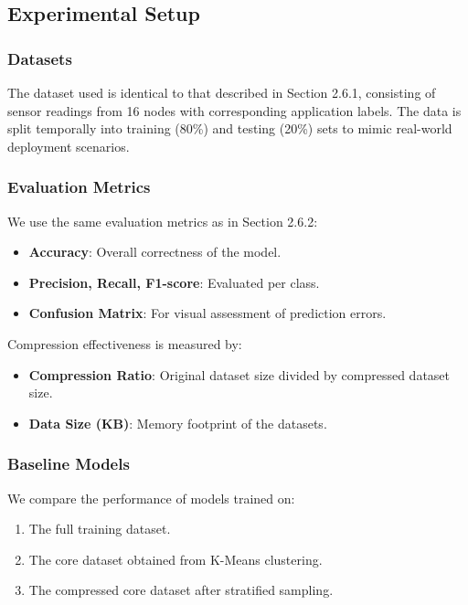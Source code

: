 \documentclass{article}
\begin{document}
\subsection{Experimental Setup}

\subsubsection{Datasets}

The dataset used is identical to that described in Section 2.6.1, consisting of sensor readings from 16 nodes with corresponding application labels. The data is split temporally into training (80\%) and testing (20\%) sets to mimic real-world deployment scenarios.

\subsubsection{Evaluation Metrics}

We use the same evaluation metrics as in Section 2.6.2:

\begin{itemize}
    \item \textbf{Accuracy}: Overall correctness of the model.
    \item \textbf{Precision, Recall, F1-score}: Evaluated per class.
    \item \textbf{Confusion Matrix}: For visual assessment of prediction errors.
\end{itemize}

Compression effectiveness is measured by:

\begin{itemize}
    \item \textbf{Compression Ratio}: Original dataset size divided by compressed dataset size.
    \item \textbf{Data Size (KB)}: Memory footprint of the datasets.
\end{itemize}

\subsubsection{Baseline Models}

We compare the performance of models trained on:

\begin{enumerate}
    \item The full training dataset.
    \item The core dataset obtained from K-Means clustering.
    \item The compressed core dataset after stratified sampling.
\end{enumerate}
\end{document}
